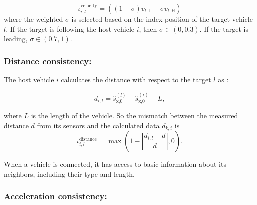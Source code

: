\begin{equation}
    \iota_{i,l}^\text{velocity} = ((1-\sigma) v_{l,\text{L}} +\sigma  v_{l,\text{H}})    
\end{equation}
where the weighted $\sigma$ is selected based on the index position of the target vehicle $l$. If the target is following the host vehicle $i$, then $\sigma \in (0, 0.3)$. If the target is leading, $\sigma \in (0.7, 1)$.


\subsubsection{Distance consistency:}
The host vehicle $i$ calculates the distance with respect to the target $l$ as :

\begin{equation*}
    d_{i,l} = \hat{s}_{\text{x,}0}^{(l)} - \hat{s}_{\text{x,}0}^{(i)} - L,
\end{equation*} 

where $L$ is the length of the vehicle. 
So the mismatch between the measured distance $d$ from its sensors and the calculated data $d_{k,i}$ is 
\begin{equation}
    \iota_{i,l}^{\text{distance}} = \max\left(1 - \left|\frac{d_{i,l} - d}{d}\right|, 0\right).
\end{equation}
\begin{assumption}\label{assum_connect}
When a vehicle is connected, it has access to basic information about its neighbors, including their type and length.
\end{assumption}

\subsubsection{Acceleration consistency:}


